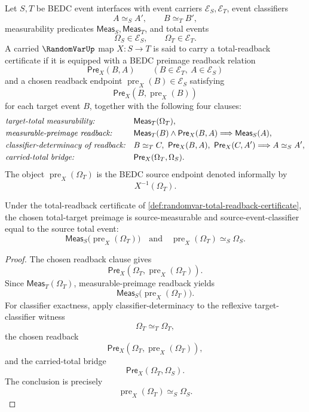 \begin{definition}
\label{def:randomvar-total-readback-certificate}
Let $S,T$ be BEDC event interfaces with event carriers $\mathcal E_S,\mathcal E_T$, event classifiers
$$
A\simeq_S A',\qquad B\simeq_T B',
$$
measurability predicates $\mathsf{Meas}_S,\mathsf{Meas}_T$, and total events
$$
\Omega_S\in\mathcal E_S,\qquad \Omega_T\in\mathcal E_T.
$$
A carried $\RandomVarUp$ map $X:S\to T$ is said to carry a total-readback certificate if it is equipped with a BEDC preimage readback relation
$$
\mathsf{Pre}_X(B,A)
\qquad
(B\in\mathcal E_T,\ A\in\mathcal E_S)
$$
and a chosen readback endpoint $\operatorname{pre}_X(B)\in\mathcal E_S$ satisfying
$$
\mathsf{Pre}_X(B,\operatorname{pre}_X(B))
$$
for each target event $B$, together with the following four clauses:
$$
\begin{aligned}
&\text{\emph{target-total measurability:}}
&&\mathsf{Meas}_T(\Omega_T),\\
&\text{\emph{measurable-preimage readback:}}
&&\mathsf{Meas}_T(B)\wedge \mathsf{Pre}_X(B,A)\Longrightarrow \mathsf{Meas}_S(A),\\
&\text{\emph{classifier-determinacy of readback:}}
&&B\simeq_T C,\ \mathsf{Pre}_X(B,A),\ \mathsf{Pre}_X(C,A')
   \Longrightarrow A\simeq_S A',\\
&\text{\emph{carried-total bridge:}}
&&\mathsf{Pre}_X(\Omega_T,\Omega_S).
\end{aligned}
$$
The object $\operatorname{pre}_X(\Omega_T)$ is the BEDC source endpoint denoted informally by
$$
X^{-1}(\Omega_T).
$$
\end{definition}

\begin{theorem}
\label{thm:randomvar-total-event-preimage-exactness}
Under the total-readback certificate of \autoref{def:randomvar-total-readback-certificate}, the chosen total-target preimage is source-measurable and source-event-classifier equal to the source total event:
$$
\mathsf{Meas}_S\bigl(\operatorname{pre}_X(\Omega_T)\bigr)
\quad\text{and}\quad
\operatorname{pre}_X(\Omega_T)\simeq_S \Omega_S.
$$
\end{theorem}
\begin{proof}
The chosen readback clause gives
$$
\mathsf{Pre}_X(\Omega_T,\operatorname{pre}_X(\Omega_T)).
$$
Since $\mathsf{Meas}_T(\Omega_T)$, measurable-preimage readback yields
$$
\mathsf{Meas}_S\bigl(\operatorname{pre}_X(\Omega_T)\bigr).
$$
For classifier exactness, apply classifier-determinacy to the reflexive target-classifier witness
$$
\Omega_T\simeq_T\Omega_T,
$$
the chosen readback
$$
\mathsf{Pre}_X(\Omega_T,\operatorname{pre}_X(\Omega_T)),
$$
and the carried-total bridge
$$
\mathsf{Pre}_X(\Omega_T,\Omega_S).
$$
The conclusion is precisely
$$
\operatorname{pre}_X(\Omega_T)\simeq_S\Omega_S.
$$
\end{proof}

